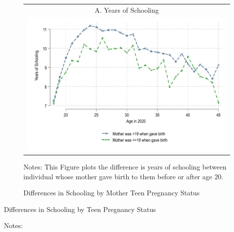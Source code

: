 \documentclass[12pt,notitlepage,a4paper]{article}
\begin{document}
\begin{figure}[H]
\captionsetup{justification=centering}
\caption{Differences in Schooling by Mother Teen Pregnancy Status} 
\begin{centering}
{\begin{tabular}{c}
A. Years of Schooling  \\
\includegraphics[scale=.8]{output/schooling_dif.pdf}  \\
\end{tabular}\par}
 	 	\vspace{.2cm} %
\begin{spacing}{0.7}
{\footnotesize{}Notes: This Figure plots the difference is years of schooling between individual whose mother gave birth to them before or after age 20. 
}{\footnotesize\par}
\end{spacing}
\end{centering}
\end{figure}

\begin{table}[H]
\captionsetup{justification=centering}
\begin{centering}
    \caption{Differences in Schooling by Teen Pregnancy Status}
    \label{tab:did}
\par\end{centering}
\begin{centering}
 \scalebox{0.9}{}
 	\vspace{.2cm} %
\par\end{centering}
\begin{spacing}{0.7}
{\footnotesize{}Notes:  }
{\footnotesize\par}
\end{spacing}
\end{table}
\end{document}
